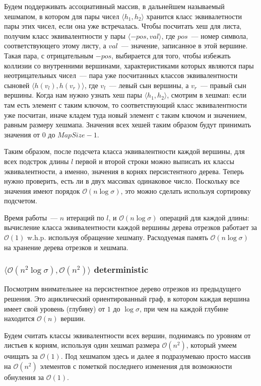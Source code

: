 Будем поддерживать ассоциативный массив, в дальнейшем называемый хешмапом, в котором для пары чисел $\langle h_1, h_2 \rangle$ хранится класс эквивалетности пары этих чисел, если она уже встречалась. Чтобы посчитать хеш для листа, получим класс эквивалентности у пары $\langle -pos, val \rangle$, где $pos$~--- номер символа, соответствующего этому листу, а $val$~--- значение, записанное в этой вершине. Такая пара, с отрицательным $-pos$, выбирается для того, чтобы избежать коллизии со внутренними вершинами, характеристиками которых являются пары неотрицательных чисел~--- пара уже посчитанных классов эквивалентности сыновей $\langle h(v_l), h(v_r) \rangle$, где $v_l$~--- левый сын вершины, а $v_r$~--- правый сын вершины. Когда нам нужно узнать хеш пары $\langle h_1, h_2 \rangle$, смотрим в хешмап: если там есть элемент с таким ключом, то соответствующий класс эквивалентности уже посчитан, иначе кладем туда новый элемент с таким ключом и значением, равным размеру хешмапа. Значения всех хешей таким образом будут принимать значения от $0$ до $MapSize - 1$.

Таким образом, после подсчета класса эквивалентности каждой вершины, для всех подстрок длины $l$ первой и второй строки можно выписать их классы эквивалентности, а именно, значения в корнях персистентного дерева. Теперь нужно проверить, есть ли в двух массивах одинаковое число. Поскольку все значения имеют порядок $\mathcal{O}(n \log \sigma)$, это можно сделать используя сортировку подсчетом.

Время работы~--- $n$ итераций по $l$, и $\mathcal{O}(n \log \sigma)$ операций для каждой длины: вычисление класса эквивалентности каждой вершины дерева отрезков работает за $\mathcal{O}(1)$ w.h.p. используя обращение хешмапу. Расходуемая память $\mathcal{O}(n \log \sigma)$ на хранение дерева отрезков и хешмапа.


\subsubsection{$\langle \mathcal{O}(n^2 \log \sigma), \mathcal{O}(n^2) \rangle$ deterministic}

Посмотрим внимательнее на персистентное дерево отрезков из предыдущего решения. Это ациклический ориентированный граф, в котором каждая вершина имеет свой уровень (глубину) от $1$ до $\log \sigma$, при чем на каждой глубине находится $\mathcal{O}(n)$ вершин.

Будем считать классы эквивалентности всех вершин, поднимаясь по уровням от листьев к корням, используя один хешмап размера $\mathcal{O}(n^2)$, который умеем очищать за $\mathcal{O}(1)$. Под хешмапом здесь и далее я подразумеваю просто массив на $\mathcal{O}(n^2)$ элементов с пометкой последнего изменения для возможности обнуления за $\mathcal{O}(1)$.

